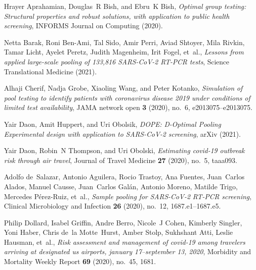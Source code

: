 \documentclass{article}
\begin{document}

\providecommand{\bysame}{\leavevmode\hbox to3em{\hrulefill}\thinspace}
\providecommand{\MR}{\relax\ifhmode\unskip\space\fi MR }
\providecommand{\MRhref}[2]{%
  \href{http://www.ams.org/mathscinet-getitem?mr=#1}{#2}
}
\providecommand{\href}[2]{#2}
\begin{thebibliography}{10}

Hrayer Aprahamian, Douglas~R Bish, and Ebru~K Bish, \emph{Optimal group
  testing: Structural properties and robust solutions, with application to
  public health screening}, INFORMS Journal on Computing (2020).

Netta Barak, Roni Ben-Ami, Tal Sido, Amir Perri, Aviad Shtoyer, Mila Rivkin,
  Tamar Licht, Ayelet Peretz, Judith Magenheim, Irit Fogel, et~al.,
  \emph{Lessons from applied large-scale pooling of 133,816 {SARS-CoV}-2
  {RT-PCR} tests}, Science Translational Medicine (2021).

Alhaji Cherif, Nadja Grobe, Xiaoling Wang, and Peter Kotanko, \emph{Simulation
  of pool testing to identify patients with coronavirus disease 2019 under
  conditions of limited test availability}, JAMA network open \textbf{3}
  (2020), no.~6, e2013075--e2013075.

Yair Daon, Amit Huppert, and Uri Obolsik, \emph{{DOPE}: {D}-{O}ptimal {P}ooling
  {E}xperimental design with application to {SARS-CoV}-2 screening}, {arXiv}
  (2021).

Yair Daon, Robin~N Thompson, and Uri Obolski, \emph{Estimating covid-19
  outbreak risk through air travel}, Journal of Travel Medicine \textbf{27}
  (2020), no.~5, taaa093.

Adolfo de~Salazar, Antonio Aguilera, Rocio Trastoy, Ana Fuentes, Juan~Carlos
  Alados, Manuel Causse, Juan~Carlos Gal{\'a}n, Antonio Moreno, Matilde Trigo,
  Mercedes P{\'e}rez-Ruiz, et~al., \emph{Sample pooling for {SARS-CoV-2 RT-PCR}
  screening}, Clinical Microbiology and Infection \textbf{26} (2020), no.~12,
  1687.e1--1687.e5.

Philip Dollard, Isabel Griffin, Andre Berro, Nicole~J Cohen, Kimberly Singler,
  Yoni Haber, Chris de~la Motte~Hurst, Amber Stolp, Sukhshant Atti, Leslie
  Hausman, et~al., \emph{Risk assessment and management of covid-19 among
  travelers arriving at designated us airports, january 17--september 13,
  2020}, Morbidity and Mortality Weekly Report \textbf{69} (2020), no.~45,
  1681.


\end{thebibliography}
\end{document}
